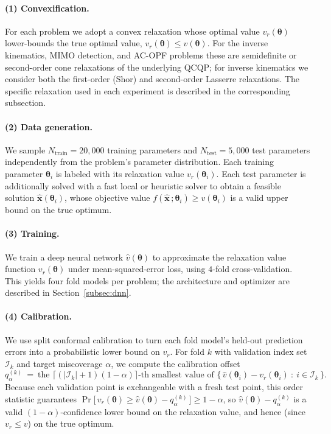 \documentclass[10pt]{article} %
\theoremstyle{plain}
\theoremstyle{definition}
\theoremstyle{remark}
\begin{document}
\paragraph{(1) Convexification.} For each problem we adopt a convex relaxation whose optimal value $v_r(\bm{\theta})$ lower-bounds the true optimal value, $v_r(\bm{\theta}) \leq v(\bm{\theta})$. For the inverse kinematics, MIMO detection, and AC-OPF problems these are semidefinite or second-order cone relaxations of the underlying QCQP; for inverse kinematics we consider both the first-order (Shor) and second-order Lasserre relaxations. The specific relaxation used in each experiment is described in the corresponding subsection.

\paragraph{(2) Data generation.} We sample $N_{\text{train}} = 20{,}000$ training parameters and $N_{\text{test}} = 5{,}000$ test parameters independently from the problem's parameter distribution. Each training parameter $\bm{\theta}_i$ is labeled with its relaxation value $v_r(\bm{\theta}_i)$. Each test parameter is additionally solved with a fast local or heuristic solver to obtain a feasible solution $\hat{\mathbf{x}}(\bm{\theta}_i)$, whose objective value $f(\hat{\mathbf{x}}\,;\bm{\theta}_i) \geq v(\bm{\theta}_i)$ is a valid upper bound on the true optimum.

\paragraph{(3) Training.} We train a deep neural network $\hat{v}(\bm{\theta})$ to approximate the relaxation value function $v_r(\bm{\theta})$ under mean-squared-error loss, using $4$-fold cross-validation. This yields four fold models per problem; the architecture and optimizer are described in Section~\ref{subsec:dnn}.

\paragraph{(4) Calibration.} We use split conformal calibration to turn each fold model's held-out prediction errors into a probabilistic lower bound on $v_r$. For fold $k$ with validation index set $\mathcal{I}_k$ and target miscoverage $\alpha$, we compute the calibration offset
\begin{equation}
    q^{(k)}_\alpha ~=~ \text{the } \big\lceil (|\mathcal{I}_k| + 1)(1 - \alpha) \big\rceil\text{-th smallest value of } \big\{\, \hat{v}(\bm{\theta}_i) - v_r(\bm{\theta}_i) ~:~ i \in \mathcal{I}_k \,\big\}.
    \label{eq:conformal-offset}
\end{equation}
Because each validation point is exchangeable with a fresh test point, this order statistic guarantees $\Pr\!\big[\, v_r(\bm{\theta}) \geq \hat{v}(\bm{\theta}) - q^{(k)}_\alpha \,\big] \geq 1 - \alpha$, so $\hat{v}(\bm{\theta}) - q^{(k)}_\alpha$ is a valid $(1-\alpha)$-confidence lower bound on the relaxation value, and hence (since $v_r \leq v$) on the true optimum.
\end{document}
